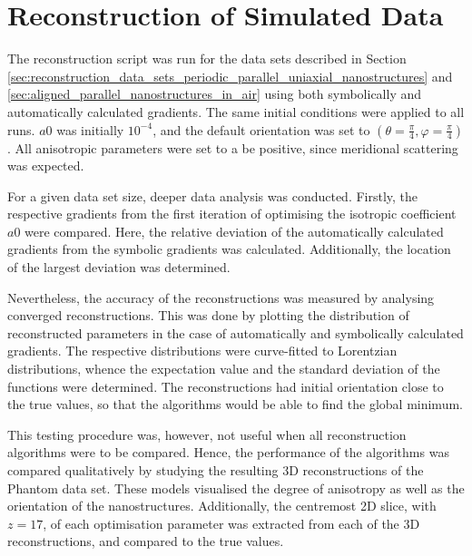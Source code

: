 

\section{Reconstruction of Simulated Data}\label{sec:pp_nanostructures_reconstruction}


The reconstruction script was run for the data sets described in Section \ref{sec:reconstruction_data_sets_periodic_parallel_uniaxial_nanostructures} and \ref{sec:aligned_parallel_nanostructures_in_air}
using both symbolically and automatically calculated gradients.
The same initial conditions were applied to all runs.
$a0$ was initially $10^{-4}$, and the default orientation was set to $\left( \theta = \frac{\pi}{4}, \varphi = \frac{\pi}{4} \right)$.
All anisotropic parameters were set to a be positive, since meridional scattering was expected.

For a given data set size, deeper data analysis was conducted.
Firstly, the respective gradients from the first iteration of optimising the isotropic coefficient $a0$ were compared.
Here, the relative deviation of the automatically calculated gradients from the symbolic gradients was calculated.
Additionally, the location of the largest deviation was determined.

Nevertheless, the accuracy of the reconstructions was measured by analysing converged reconstructions.
This was done by plotting the distribution of reconstructed parameters in the case of automatically and symbolically calculated gradients.
The respective distributions were curve-fitted to Lorentzian distributions, whence the expectation value and the standard deviation of the functions were determined.
The reconstructions had initial orientation close to the true values, so that the algorithms would be able to find the global minimum.

This testing procedure was, however, not useful when all reconstruction algorithms were to be compared.
Hence, the performance of the algorithms was compared qualitatively by studying the resulting 3D reconstructions of the Phantom data set.
These models visualised the degree of anisotropy as well as the orientation of the nanostructures.
Additionally, the centremost 2D slice, with $z = 17$, of each optimisation parameter was extracted from each of the 3D reconstructions, and compared to the true values.

